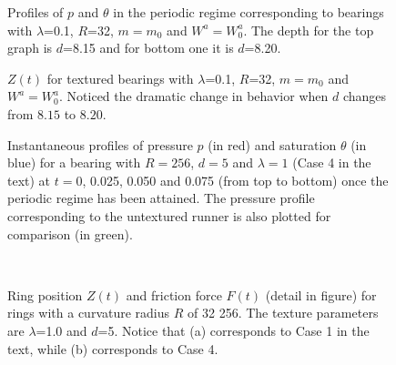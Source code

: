 \begin{figure}[h]
     \begin{center}
	\scalebox{0.7}{}
    \end{center}
\caption{Profiles of $p$ and $\theta$ in the periodic regime corresponding to
bearings with $\lambda$=0.1, $R$=32, $m = m_0$ and $W^a=W^a_0$. The depth for the top 
graph is $d$=8.15 and for bottom one it is $d$=8.20.}  
\label{fig:disc}
\end{figure}

\begin{figure}[h]
     \begin{center}
	\scalebox{0.8}{}
    \end{center}
\caption{$Z(t)$ for textured bearings with $\lambda$=0.1, $R$=32, $m=m_0$ and 
$W^a = W^a_0$. 
Noticed the dramatic change in behavior when $d$ changes from $8.15$ to $8.20$.} 
\label{fig:disc-Z}
\end{figure}


\begin{figure}[h]
     \begin{center}
	\scalebox{0.7}{}
    \end{center}
\caption{
Instantaneous profiles of pressure $p$ (in red) and saturation $\theta$ (in blue) for a bearing with $R=256$, $d=5$ and $\lambda=1$ (Case 4 in the text) 
at $t=0$, 0.025, 
0.050 and 0.075 (from top to bottom) once the periodic regime has been attained. 
The pressure profile corresponding to the untextured runner 
is also plotted for comparison (in green).
}  
\label{figR256bubblesper1}
\end{figure}



\begin{figure}[h]
     \begin{center}
	\subfigure[][]{\scalebox{0.62}{}\label{fig:32-Z}} 
	\subfigure[][]{\scalebox{0.62}{}\label{fig:256-Z}} \\	
    \end{center}
\caption{Ring position $Z(t)$ and friction force $F(t)$ (detail in figure) for rings with a curvature radius $R$ of  32 
 256. The texture parameters are $\lambda$=1.0 and $d$=5. Notice that (a) corresponds to Case 1 in the text, while (b) corresponds to Case 4.}  
\label{fig:cases1and4}
\end{figure}



